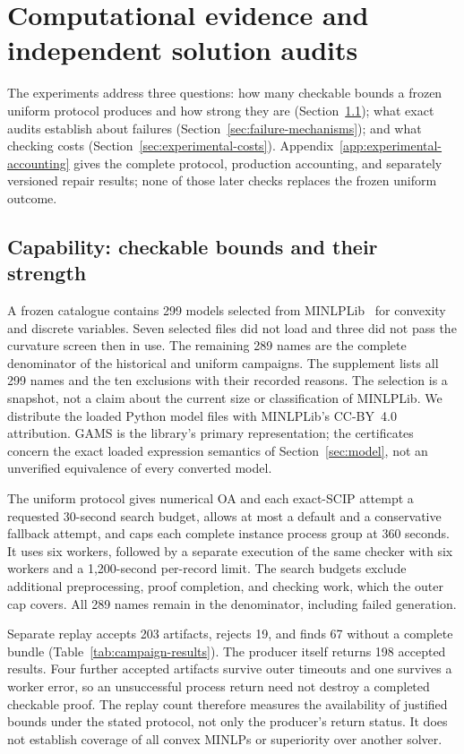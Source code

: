 \section{Computational evidence and independent solution audits}
\label{sec:experiments}

The experiments address three questions: how many checkable bounds a frozen
uniform protocol produces and how strong they are (Section~\ref{sec:replay-results});
what exact audits establish about failures (Section~\ref{sec:failure-mechanisms});
and what checking costs (Section~\ref{sec:experimental-costs}). Appendix~\ref{app:experimental-accounting}
gives the complete protocol, production accounting, and separately versioned
repair results; none of those later checks replaces the frozen uniform outcome.

\subsection{Capability: checkable bounds and their strength}
\label{sec:replay-results}

A frozen catalogue contains 299 models selected from MINLPLib~\citep{minlplib}
for convexity and discrete variables. Seven selected
files did not load and three did not pass the curvature screen then in use.
The remaining 289 names are the complete denominator of the historical and
uniform campaigns. The supplement lists all 299 names and the ten exclusions
with their recorded reasons. The selection is a snapshot, not a claim about
the current size or classification of MINLPLib. We distribute the loaded
Python model files with MINLPLib's CC-BY~4.0 attribution. GAMS is the library's
primary representation; the certificates concern the exact loaded expression
semantics of Section~\ref{sec:model}, not an unverified equivalence of every
converted model.

The uniform protocol gives numerical OA and each exact-SCIP attempt a
requested 30-second search budget, allows at most a default and a conservative
fallback attempt, and caps each complete instance process group at 360 seconds.
It uses six workers, followed by a separate execution of the same checker with
six workers and a 1,200-second per-record limit. The search budgets exclude
additional preprocessing, proof completion, and checking work, which the outer
cap covers. All 289 names remain in the denominator, including failed generation.

Separate replay accepts 203 artifacts, rejects 19, and finds 67 without a
complete bundle (Table~\ref{tab:campaign-results}). The producer itself returns
198 accepted results. Four further accepted artifacts survive outer
timeouts and one survives a worker error, so an unsuccessful process return
need not destroy a completed checkable proof. The replay count therefore
measures the availability of justified bounds under the stated protocol, not
only the producer's return status. It does not establish coverage of all convex
MINLPs or superiority over another solver.

